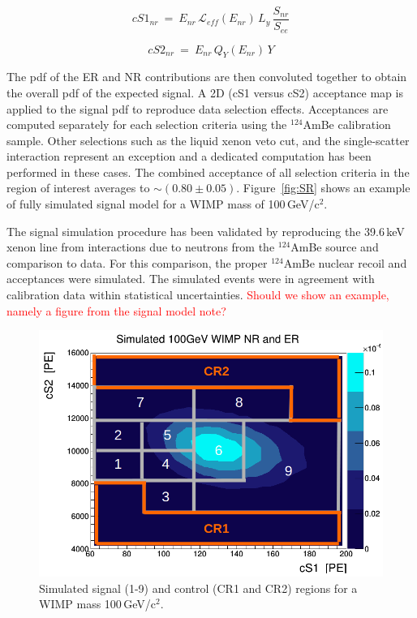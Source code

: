 {\begin{equation}
cS1_{nr} ~=~ E_{nr} \, \mathcal{L}_{eff}(E_{nr}) \, L_{y} \, \frac{S_{nr}}{S_{ee}}
\label{f:cs1}
\end{equation}

\begin{equation}
cS2_{nr}  ~ = ~ E_{nr} \, Q_{Y}(E_{nr}) \, Y
\label{f:cs2}
\end{equation}

The pdf of the ER and NR contributions are then convoluted together to obtain the overall pdf of the expected signal.
A 2D (cS1 versus cS2) acceptance map is applied to the signal pdf to reproduce data selection effects. Acceptances are computed separately for each selection 
criteria using the $^{124}$AmBe calibration sample. Other selections such as the liquid xenon veto cut, and the single-scatter interaction represent an exception  and 
a dedicated computation has been performed in these cases. The combined acceptance  of all selection criteria in the region of interest averages to $\sim$$(0.80\pm0.05)$. 
Figure~\ref{fig:SR} shows an example of fully simulated signal model for a WIMP mass of 100\,GeV/c$^2$. 

The signal simulation procedure has been validated by reproducing the 39.6\,keV xenon line from interactions due to neutrons from the 
$^{124}$AmBe source and comparison to data. For this comparison, the proper  $^{124}$AmBe nuclear recoil and acceptances
were simulated. The simulated events were in agreement  with calibration data within statistical uncertainties. 
{\textcolor{red} {Should we show an example, namely a figure from the signal model note?}}

\begin{figure}[t!]
  \includegraphics[width=\linewidth]{images/wimp_in_sr.png}
  \caption{Simulated signal (1-9) and control (CR1 and CR2) regions for a WIMP mass 100\,GeV/c$^2$.}
  \label{fig:SR2}
\end{figure}


}
